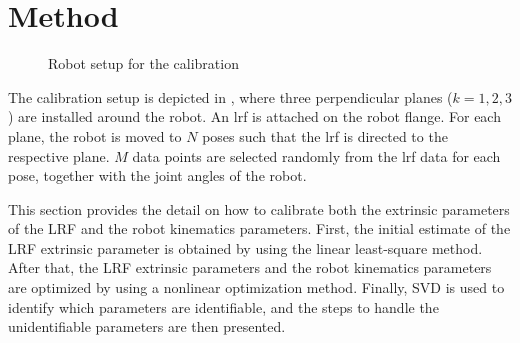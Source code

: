 \section{Method}
\label{sec:method}
\begin{figure}[t]
  \centering
  \vspace*{2mm}
  \caption{Robot setup for the calibration}
  \label{fig:robot_setup}
\end{figure}

The calibration setup is depicted in , where three perpendicular planes ($k=1,2,3$) are installed around the robot. An \ac{lrf} is attached on the robot flange. For each plane, the robot is moved to $N$ poses such that the \ac{lrf} is directed to the respective plane. $M$ data points are selected randomly from the \ac{lrf} data for each pose, together with the joint angles of the robot. 

This section provides the detail on how to calibrate both the extrinsic parameters of the LRF and the robot kinematics parameters. First, the initial estimate of the LRF extrinsic parameter is obtained by using the linear least-square method. After that, the LRF extrinsic parameters and the robot kinematics parameters are optimized by using a nonlinear optimization method. 
Finally, SVD is used to identify which parameters are identifiable, and the steps to handle the unidentifiable parameters are then presented. 
